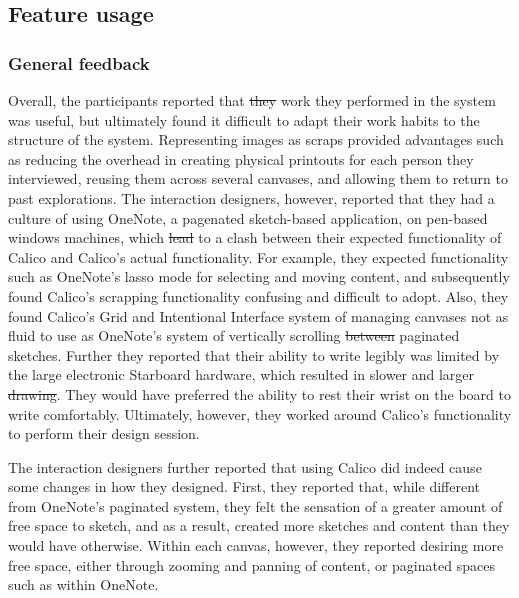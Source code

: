 \documentclass[12pt,fleqn]{ucithesis}
\providecommand{\DIFaddtex}[1]{{\protect\color{blue}\uwave{#1}}} %
\providecommand{\DIFdeltex}[1]{{\protect\color{red}\sout{#1}}}                      %
\providecommand{\DIFaddbegin}{} %
\providecommand{\DIFaddend}{} %
\providecommand{\DIFdelbegin}{} %
\providecommand{\DIFdelend}{} %
\providecommand{\DIFadd}[1]{\texorpdfstring{\DIFaddtex{#1}}{#1}} %
\providecommand{\DIFdel}[1]{\texorpdfstring{\DIFdeltex{#1}}{}} %
\begin{document}
\subsection{Feature usage}

\subsubsection{General feedback}

Overall, the participants reported that \DIFdelbegin \DIFdel{they }\DIFdelend \DIFaddbegin \DIFadd{the }\DIFaddend work they performed in the system was useful, but ultimately found it difficult to adapt their work habits to the structure of the system. Representing images as scraps provided advantages such as reducing the overhead in creating physical printouts for each person they interviewed, reusing them across several canvases, and allowing them to return to past explorations. The interaction designers, however, reported that they had a culture of using OneNote, a pagenated sketch-based application, on pen-based windows machines, which \DIFdelbegin \DIFdel{lead }\DIFdelend \DIFaddbegin \DIFadd{led }\DIFaddend to a clash between their expected functionality of Calico and Calico's actual functionality. For example, they expected functionality such as OneNote's lasso mode for selecting and moving content, and subsequently found Calico's scrapping functionality confusing and difficult to adopt. Also, they found Calico's Grid and Intentional Interface system of managing canvases not as fluid to use as OneNote's system of vertically scrolling \DIFdelbegin \DIFdel{between }\DIFdelend \DIFaddbegin \DIFadd{through }\DIFaddend paginated sketches. Further they reported that their ability to write legibly was limited by the large electronic Starboard hardware, which resulted in slower and larger \DIFdelbegin \DIFdel{drawing}\DIFdelend \DIFaddbegin \DIFadd{content generation}\DIFaddend . They would have preferred the ability to rest their wrist on the board to write comfortably. Ultimately, however, they worked around Calico's functionality to perform their design session.

The interaction designers further reported that using Calico did indeed cause some changes in how they designed. First, they reported that, while different from OneNote's paginated system, they felt the sensation of a greater amount of free space to sketch, and as a result, created more sketches and content than they would have otherwise. Within each canvas, however, they reported desiring more free space, either through zooming and panning of content, or paginated spaces such as within OneNote. 
\end{document}
